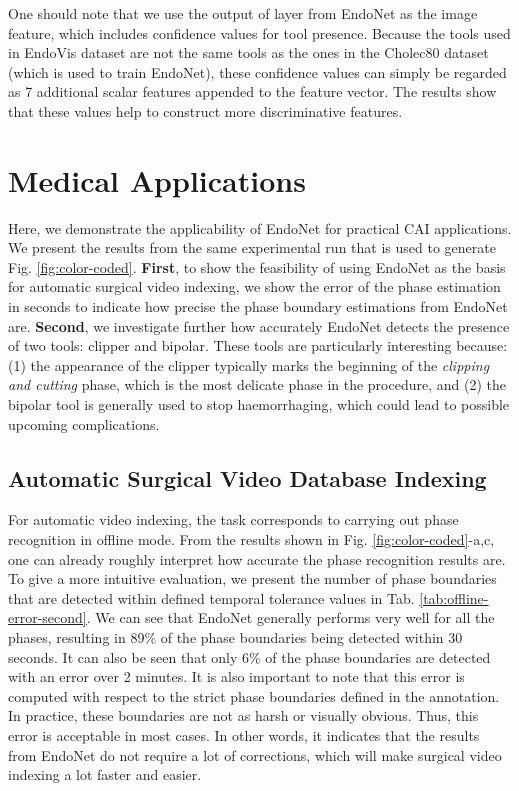 \documentclass[journal]{IEEEtran} \usepackage{amssymb}
\begin{document}
One should note that we use the output
of layer  from EndoNet as the image feature, which
includes  confidence values for tool presence. Because the tools used
in EndoVis dataset are not the same tools as the ones in the Cholec80
dataset (which is used to train EndoNet), these confidence values can simply
be regarded as 7 additional scalar features appended to the feature vector. The results show that these values help to construct more discriminative features. 

\section{Medical Applications \label{sect:applications}}

Here, we demonstrate the applicability of EndoNet for 
practical CAI applications. We present the results from the same experimental 
run that is used to generate Fig. \ref{fig:color-coded}. \textbf{First}, 
to show the feasibility of using EndoNet as the basis for automatic 
surgical video indexing, we show the error of the phase estimation 
in seconds to indicate how precise the phase boundary estimations from EndoNet are. 
\textbf{Second}, we investigate further how accurately EndoNet detects the presence of two tools: clipper and bipolar. These tools are particularly interesting because: (1) 
the appearance of the clipper typically marks the beginning of the 
\textit{clipping and cutting} phase, which is the most delicate phase in the procedure, 
and (2) the bipolar tool is generally used to stop haemorrhaging, which could lead to 
possible upcoming complications.

\subsection{Automatic Surgical Video Database Indexing}
For automatic video indexing, the task corresponds to carrying out phase recognition in 
offline mode. 
From the results shown 
in Fig. \ref{fig:color-coded}-a,c, one can already roughly interpret how accurate the phase 
recognition results are. To give a more intuitive evaluation, 
we present the number of phase boundaries that are 
detected within defined temporal tolerance values in Tab. \ref{tab:offline-error-second}. 
We can see that EndoNet generally performs very well for all the phases, 
resulting in 89\% of the phase boundaries being detected within 30 seconds.
It can also be seen that only 6\% of the phase boundaries are detected with an error
over 2 minutes. It is also important to note that this error is computed with respect to the 
strict phase boundaries defined in the annotation. In practice, 
these boundaries are not as harsh or visually obvious. Thus, this 
error is  acceptable in most cases. In other words, 
it indicates that the results from EndoNet do not require a lot of corrections, 
which will make surgical video indexing a lot faster and easier. 
\end{document}
